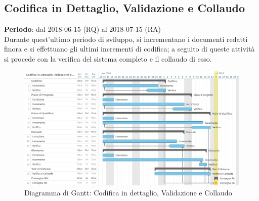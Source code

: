 \subsection{Codifica in Dettaglio, Validazione e Collaudo}
\textbf{Periodo}: dal 2018-06-15 (RQ) al 2018-07-15 (RA)\\

Durante quest'ultimo periodo di sviluppo, si incrementano i documenti redatti finora e si effettuano gli ultimi incrementi di codifica; a seguito di queste attività si procede con la verifica del sistema completo e il collaudo di esso.

\begin{figure}[h!]
	\centerline{\includegraphics[scale=0.45]{img/DiagrammiGantt/CodificaValidazioneCollaudo.jpg}}
	\caption{Diagramma di Gantt: Codifica in dettaglio, Validazione e Collaudo}
	\label{fig:gantt_cod_valid_coll}
\end{figure}
\clearpage
